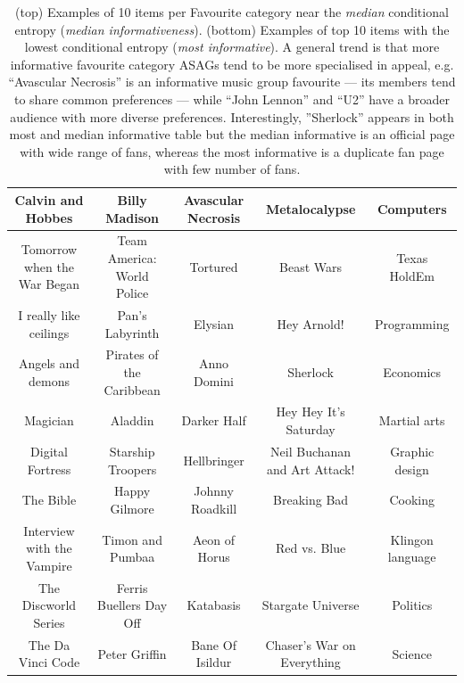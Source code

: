 \begin{table}[t!]
{\begin{tabular}{|c|c|c|c|c|}
\hline \hline
Calvin and Hobbes & Billy Madison & Avascular Necrosis & Metalocalypse & Computers\\
\hline
Tomorrow when the War Began & Team America: World Police & Tortured & Beast Wars & Texas HoldEm \\
\hline
I really like ceilings  & Pan's Labyrinth & Elysian & Hey Arnold! & Programming\\
\hline
Angels and demons  & Pirates of the Caribbean & Anno Domini & Sherlock & Economics\\
\hline
Magician  & Aladdin & Darker Half & Hey Hey It's Saturday & Martial arts\\
\hline
Digital Fortress  & Starship Troopers & Hellbringer & Neil Buchanan and Art Attack! & Graphic design\\
\hline
The Bible  & Happy Gilmore & Johnny Roadkill & Breaking Bad & Cooking\\
\hline
Interview with the Vampire  & Timon and Pumbaa & Aeon of Horus & Red vs. Blue & Klingon language\\
\hline
The Discworld Series  & Ferris Buellers Day Off & Katabasis & Stargate Universe & Politics\\
\hline
The Da Vinci Code  & Peter Griffin & Bane Of Isildur & Chaser's War on Everything & Science\\
\hline
\end{tabular}}
\caption{(top) Examples of 10 items per Favourite category near the \emph{median} conditional entropy (\emph{median informativeness}).
(bottom) Examples of top 10 items with the lowest conditional entropy (\emph{most informative}).
A general trend is that more informative favourite category ASAGs tend to be more specialised in
appeal, e.g. ``Avascular Necrosis'' is an informative music group favourite --- its members
tend to share common preferences --- while ``John Lennon'' and ``U2'' have a broader audience with
more diverse preferences. 
Interestingly, ''Sherlock''  appears in both most and median informative table but the median informative is
an official page with wide range of fans, whereas the most informative is a duplicate fan page with few number of fans.}
\label{table:fav_examples}
\end{table}

